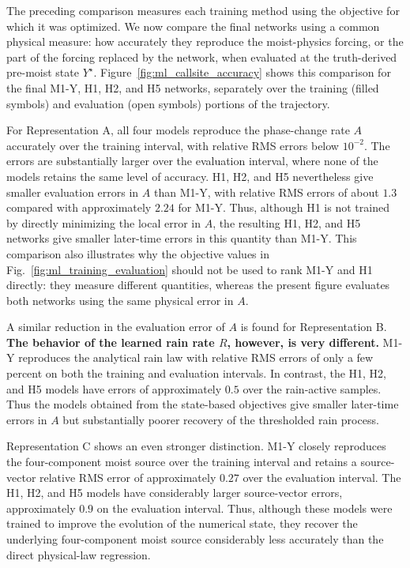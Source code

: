 \documentclass[12pt]{article}
\begin{document}
The preceding comparison measures each training method using the objective for
which it was optimized. We now compare the final networks using a common
physical measure: how accurately they reproduce the moist-physics forcing, or
the part of the forcing replaced by the network, when evaluated at the
truth-derived pre-moist state $Y^\star$. Figure~\ref{fig:ml_callsite_accuracy}
shows this comparison for the final M1-Y, H1, H2, and H5 networks, separately
over the training (filled symbols) and evaluation (open symbols) portions of
the trajectory.


For Representation A, all four models reproduce the phase-change rate $A$
accurately over the training interval, with relative RMS errors below
$10^{-2}$. The errors are substantially larger over the evaluation interval,
where none of the models retains the same level of accuracy. H1, H2, and H5
nevertheless give smaller evaluation errors in $A$ than M1-Y, with relative
RMS errors of about $1.3$ compared with approximately $2.24$ for M1-Y.
Thus, although H1 is not trained by directly minimizing the local error in
$A$, the resulting H1, H2, and H5 networks give smaller later-time errors in
this quantity than M1-Y. This comparison also illustrates why the objective
values in Fig.~\ref{fig:ml_training_evaluation} should not be used to rank
M1-Y and H1 directly: they measure different quantities, whereas the present
figure evaluates both networks using the same physical error in $A$.

A similar reduction in the evaluation error of $A$ is found for
Representation B. \textbf{The behavior of the learned rain rate $R$, however,
	is very different.} M1-Y reproduces the analytical rain law with relative RMS
errors of only a few percent on both the training and evaluation intervals.
In contrast, the H1, H2, and H5 models have errors of approximately $0.5$ over
the rain-active samples. Thus the models obtained from the state-based
objectives give smaller later-time errors in $A$ but substantially poorer
recovery of the thresholded rain process.

Representation C shows an even stronger distinction. M1-Y closely reproduces
the four-component moist source over the training interval and retains a
source-vector relative RMS error of approximately $0.27$ over the evaluation
interval. The H1, H2, and H5 models have considerably larger source-vector
errors, approximately $0.9$ on the evaluation interval. Thus, although these
models were trained to improve the evolution of the numerical state, they
recover the underlying four-component moist source considerably less
accurately than the direct physical-law regression.
\end{document}
